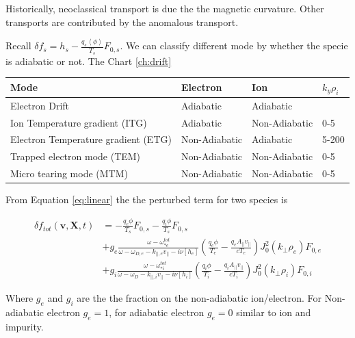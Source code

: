 Historically, neoclassical transport is due the the magnetic curvature. Other transports are contributed by the anomalous transport. 

Recall $\delta f_s = h_s - \frac{q_s\left<\phi\right>}{T_s}F_{0,s}$. We can classify different mode by whether the specie is adiabatic or not. The Chart \ref{ch:drift} 

\begin{center}
            \begin{tabular}{ | m{12em} | m{2.7cm}| m{2.7cm} | m{1.5cm} | } 
                \hline
                Mode & Electron & Ion & $k_y\rho_i$\\
                \hline
                Electron Drift & Adiabatic & Adiabatic & \\
                \hline
                Ion Temperature gradient (ITG) & Adiabatic & Non-Adiabatic & 0-5\\
                \hline
                Electron Temperature gradient (ETG) & Non-Adiabatic & Adiabatic & 5-200\\
                \hline
                Trapped electron mode (TEM) & Non-Adiabatic & Non-Adiabatic & 0-5\\
                \hline
                Micro tearing mode (MTM) & Non-Adiabatic & Non-Adiabatic & 0-5\\
                \hline
            \end{tabular}
            \label{ch:drift}
\end{center}

From Equation \ref{eq:linear} the the perturbed term for two species is

\begin{equation}
\begin{aligned}
    \delta f_{tot}(\textbf{v},\textbf{X},t){}&=-\frac{q_e\phi}{T_s}F_{0,s}-\frac{q_i\phi}{T_s}F_{0,s}
    \\
    &+
    g_e\frac{\omega -\omega_{*e}^{tot} 
    }{\omega -\omega_{D,e} 
    - k_{||,e}v_{||}-i\nu[h_e]}\left(\frac{q_e\phi}{T_e}-\frac{q_eA_{||}v_{||}}{cT_e}\right)J_0^2(k_\perp\rho_e)F_{0,e}
    \\
    &+
    g_i\frac{\omega -\omega_{*i}^{tot} 
    }{\omega -\omega_D 
    - k_{||,i}v_{||}-i\nu[h_i]}\left(\frac{q_i\phi}{T_i}-\frac{q_iA_{||}v_{||}}{cT_i}\right)J_0^2(k_\perp\rho_i)F_{0,i}
    \label{eq:linear_tot}
\end{aligned}
\end{equation}

Where $g_e$ and $g_i$ are the the fraction on the non-adiabatic ion/electron. For Non-adiabatic electron $g_e=1$, for adiabatic electron $g_e=0$ similar to ion and impurity. 

